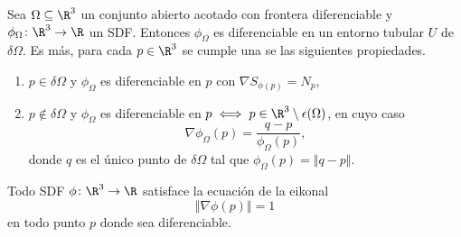 \begin{teorema}\label{teo:diff}
    Sea $\Omega \subseteq \R^3$ un conjunto abierto acotado con frontera diferenciable y $\phi_{\Omega} \colon \R^3\to \R$ un SDF. Entonces $\phi_{\Omega}$ es diferenciable en un entorno tubular $U$ de $\delta \Omega$. Es más, para cada $p\in \R^3$ se cumple una se las siguientes propiedades.
    \begin{enumerate}
        \item $p\in \delta \Omega$ y $\phi_{\Omega}$ es diferenciable en $p$ con $\nabla S_{\phi(p)} = N_p$,
        \item $p\notin \delta \Omega$ y $\phi_{\Omega}$ es diferenciable en $p \iff p\in \R^3\setminus \epsilon(\Omega)$, en cuyo caso
        \begin{equation*}
            \nabla \phi_{\Omega}(p) = \frac{q-p}{\phi_{\Omega}(p)},
        \end{equation*}
        donde $q$ es el único punto de $\delta\Omega$ tal que $\phi_{\Omega}(p) = \Vert q-p\Vert$.
    \end{enumerate}
\end{teorema}

\begin{corolario}
    Todo SDF $\phi\colon \R^3\to \R$ satisface la ecuación de la eikonal 
    \begin{equation*}
        \Vert \nabla \phi(p)\Vert = 1
    \end{equation*}
    en todo punto $p$ donde sea diferenciable.
\end{corolario}
    


